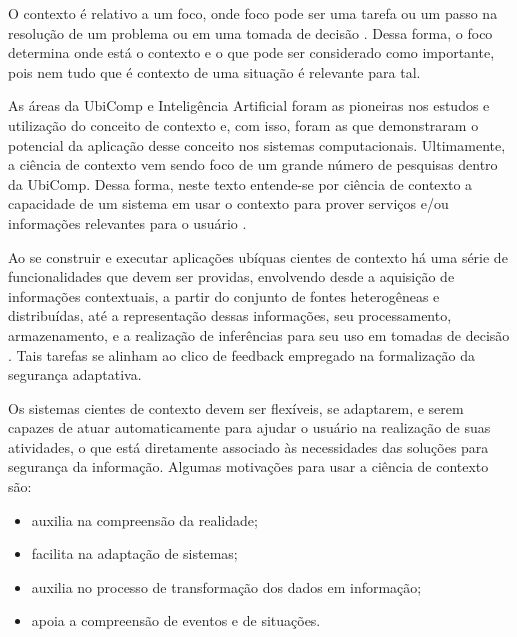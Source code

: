 \documentclass[tid,table]{texufpel} %
\begin{document}
O contexto é relativo a um foco, onde foco pode ser uma tarefa ou um passo na resolução de um problema ou em uma tomada de decisão \cite{brezillon05}. Dessa forma, o foco determina onde está o contexto e o que pode ser considerado como importante, pois nem tudo que é contexto de uma situação é relevante para tal. 
 
As áreas da UbiComp e Inteligência Artificial foram as pioneiras nos estudos e utilização do conceito de contexto e, com isso, foram as que demonstraram o potencial da aplicação desse conceito nos sistemas computacionais. Ultimamente, a ciência de contexto vem sendo foco de um grande número de pesquisas dentro da UbiComp. Dessa forma, neste texto entende-se por ciência de contexto a capacidade de um sistema em usar o contexto para prover serviços e/ou informações relevantes para o usuário \cite{dey01}.

Ao se construir e executar aplicações ubíquas cientes de contexto há uma série de funcionalidades que devem ser providas, envolvendo desde a aquisição de informações contextuais, a partir do conjunto de fontes heterogêneas e distribuídas, até a representação dessas informações, seu processamento, armazenamento, e a realização de inferências para seu uso em tomadas de decisão \cite{bellavista12}. Tais tarefas se alinham ao clico de feedback empregado na formalização da segurança adaptativa.

Os sistemas cientes de contexto devem ser flexíveis, se adaptarem, e serem capazes de atuar automaticamente para ajudar o usuário na realização de suas atividades, o que está diretamente associado às necessidades das soluções para segurança da informação. Algumas motivações para usar a ciência de contexto são: 

\begin{itemize}

\item auxilia na compreensão da realidade;

\item facilita na adaptação de sistemas;

\item auxilia no processo de transformação dos dados em informação;

\item apoia a compreensão de eventos e de situações.

\end{itemize}
\end{document}
